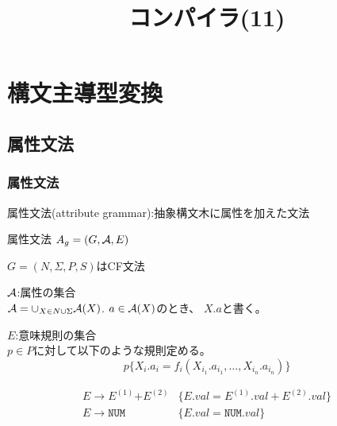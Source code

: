 \documentclass[dvipdfmx]{beamer}
\title{コンパイラ(11)}
\date{\lecturedate}
\begin{document}
\frame{\titlepage}

\section{構文主導型変換}

\subsection{属性文法}

\begin{frame}
 \frametitle{属性文法}

 属性文法(attribute grammar):抽象構文木に属性を加えた文法


 属性文法 $A_g=(G,{\cal A},E)$
 \begin{list}{}{}
  \item $G=(N,\Sigma,P,S)$はCF文法
  \item ${\cal A}$:属性の集合\\
	${\cal A}=\cup_{X\in
	N\cup\Sigma}{\cal A}(X)$.  $a\in{\cal A}(X)$のとき、
	$X.a$と書く。
  \item $E$:意味規則の集合\\
	$p\in P$に対して以下のような規則定める。
	\[
	 p\{X_i.a_i=f_i(X_{i_1}.a_{i_1},\ldots,X_{i_n}.a_{i_n})\}
	\]
 \end{list}

 \[\begin{array}{ll}
  E\rightarrow E^{(1)}\texttt{+}E^{(2)} & \{E.val=E^{(1)}.val+E^{(2)}.val\}\\
  E\rightarrow \texttt{NUM} & \{E.val=\texttt{NUM}.val\}
 \end{array}
   \]

\end{frame}
\end{document}
